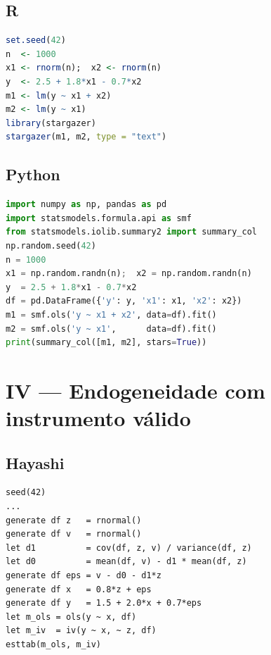 \subsection*{R}

\begin{lstlisting}[language=R, basicstyle=\ttfamily\small,
  frame=single, numbers=none, backgroundcolor=\color{codbg},
  keywordstyle=\color{keyword}\bfseries,
  stringstyle=\color{string},
  commentstyle=\color{comment}\itshape]
set.seed(42)
n  <- 1000
x1 <- rnorm(n);  x2 <- rnorm(n)
y  <- 2.5 + 1.8*x1 - 0.7*x2
m1 <- lm(y ~ x1 + x2)
m2 <- lm(y ~ x1)
library(stargazer)
stargazer(m1, m2, type = "text")
\end{lstlisting}

\subsection*{Python}

\begin{lstlisting}[language=Python, basicstyle=\ttfamily\small,
  frame=single, numbers=none, backgroundcolor=\color{codbg},
  keywordstyle=\color{keyword}\bfseries,
  stringstyle=\color{string},
  commentstyle=\color{comment}\itshape]
import numpy as np, pandas as pd
import statsmodels.formula.api as smf
from statsmodels.iolib.summary2 import summary_col
np.random.seed(42)
n = 1000
x1 = np.random.randn(n);  x2 = np.random.randn(n)
y  = 2.5 + 1.8*x1 - 0.7*x2
df = pd.DataFrame({'y': y, 'x1': x1, 'x2': x2})
m1 = smf.ols('y ~ x1 + x2', data=df).fit()
m2 = smf.ols('y ~ x1',      data=df).fit()
print(summary_col([m1, m2], stars=True))
\end{lstlisting}

\section{IV — Endogeneidade com instrumento válido}

\subsection*{Hayashi}

\begin{lstlisting}
seed(42)
...
generate df z   = rnormal()
generate df v   = rnormal()
let d1          = cov(df, z, v) / variance(df, z)
let d0          = mean(df, v) - d1 * mean(df, z)
generate df eps = v - d0 - d1*z
generate df x   = 0.8*z + eps
generate df y   = 1.5 + 2.0*x + 0.7*eps
let m_ols = ols(y ~ x, df)
let m_iv  = iv(y ~ x, ~ z, df)
esttab(m_ols, m_iv)
\end{lstlisting}

